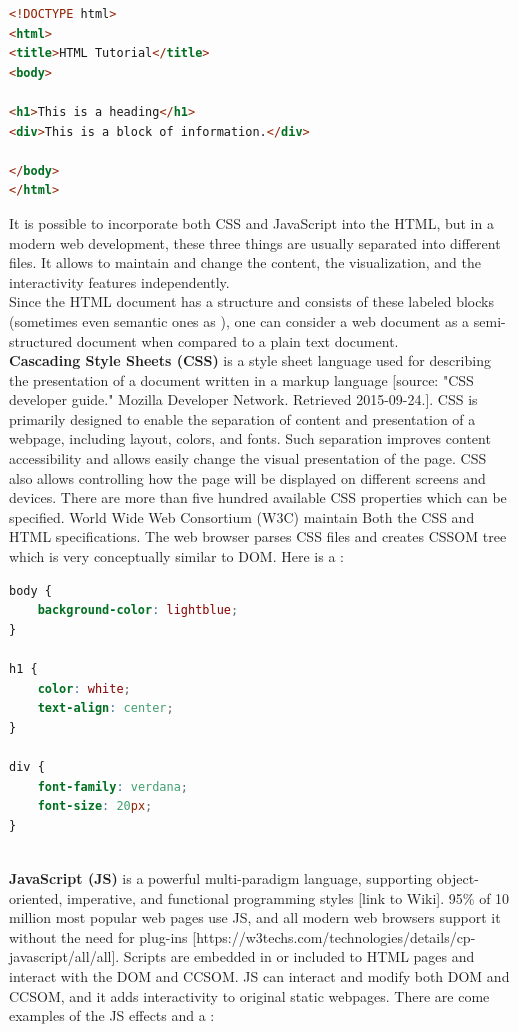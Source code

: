 \begin{lstlisting}[language=html, caption={Small example of HTML file}, label={lst:html}, captionpos=b]
<!DOCTYPE html>
<html>
<title>HTML Tutorial</title>
<body>

<h1>This is a heading</h1>
<div>This is a block of information.</div>

</body>
</html>
\end{lstlisting}

It is possible to incorporate both CSS and JavaScript into the HTML, but in a modern web development, these three things are usually separated into different files. It allows to maintain and change the content, the visualization, and the interactivity features independently.\\

Since the HTML document has a structure and consists of these labeled blocks (sometimes even semantic ones as ), one can consider a web document as a semi-structured document when compared to a plain text document.\\

\noindent\textbf{Cascading Style Sheets (CSS)} is a style sheet language used for describing the presentation of a document written in a markup language [source: "CSS developer guide." Mozilla Developer Network. Retrieved 2015-09-24.]. CSS is primarily designed to enable the separation of content and presentation of a webpage, including layout, colors, and fonts. Such separation improves content accessibility and allows easily change the visual presentation of the page. CSS also allows controlling how the page will be displayed on different screens and devices. There are more than five hundred available CSS properties which can be specified. World Wide Web Consortium (W3C) maintain Both the CSS and HTML specifications. The web browser parses CSS files and creates CSSOM tree which is very conceptually similar to DOM. Here is a : \\

\begin{lstlisting}[language=css, caption={Small example of CSS file}, label={lst:css}, captionpos=b]
body {
    background-color: lightblue;
}

h1 {
    color: white;
    text-align: center;
}

div {
    font-family: verdana;
    font-size: 20px;
}
\end{lstlisting}\\

\noindent\textbf{JavaScript (JS)} is a powerful multi-paradigm language, supporting object-oriented, imperative, and functional programming styles [link to Wiki]. 95\% of 10 million most popular web pages use JS, and all modern web browsers support it without the need for plug-ins [https://w3techs.com/technologies/details/cp-javascript/all/all]. Scripts are embedded in or included to HTML pages and interact with the DOM and CCSOM. JS can interact and modify both DOM and CCSOM, and it adds interactivity to original static webpages. There are come examples of the JS effects and a :

